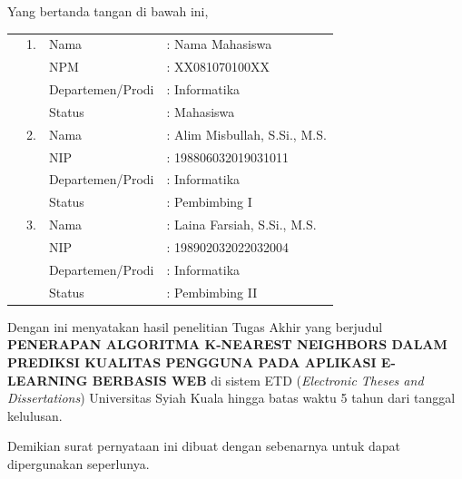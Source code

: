 \spernyataan %

\noindent
Yang bertanda tangan di bawah ini,
\vspace{-0.1cm}
\begin{table}[H]
{\renewcommand{\arraystretch}{0.7}
\begin{tabular}{M{0.6cm}lll}
	&1. 	& Nama   		&: Nama Mahasiswa \\
	&	& NPM       			&: XX081070100XX   \\
	&	& Departemen/Prodi   		&: Informatika \\
	&	& Status 				&: Mahasiswa \\  
	&2. 	& Nama  		&: Alim Misbullah, S.Si., M.S. \\
	&	& NIP       			&: 198806032019031011    \\
	&	& Departemen/Prodi   		&: Informatika \\
	&	& Status 				&: Pembimbing I \\  
	&3. 	& Nama  		&: Laina Farsiah, S.Si., M.S. \\
	&	& NIP       			&: 198902032022032004  \\
	&	& Departemen/Prodi   		&: Informatika \\
	&	& Status 				&: Pembimbing II   
\end{tabular}
}
\end{table}
\vspace{-0.4cm}
\noindent
Dengan ini menyatakan hasil penelitian Tugas Akhir yang berjudul \textbf{PENERAPAN ALGORITMA K-NEAREST NEIGHBORS DALAM PREDIKSI KUALITAS PENGGUNA PADA APLIKASI E-LEARNING BERBASIS WEB} di sistem ETD (\textit{Electronic Theses and Dissertations}) Universitas Syiah Kuala hingga batas waktu 5 tahun dari tanggal kelulusan.

\vspace{0.4cm}
\noindent
Demikian surat pernyataan ini dibuat dengan sebenarnya untuk dapat dipergunakan seperlunya.


